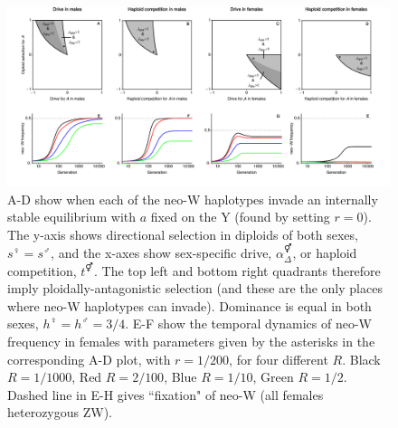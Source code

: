 \documentclass[12pt]{article}
\begin{document}
\begin{landscape}
\begin{figure}[!h]
\centering
\centerline{
\includegraphics[width=\linewidth]{All_plot_combined_PloidAntag}
}
\caption{
A-D show when each of the neo-W haplotypes invade an internally stable equilibrium with $a$ fixed on the Y (found by setting $r=0$).
The y-axis shows directional selection in diploids of both sexes, $s^\female=s^\male$, and the x-axes show sex-specific drive, $\alpha_\Delta^\Hermaphrodite$, or haploid competition, $t^\Hermaphrodite$.
The top left and bottom right quadrants therefore imply ploidally-antagonistic selection (and these are the only places where neo-W haplotypes can invade).
Dominance is equal in both sexes, $h^\female=h^\male=3/4$. 
E-F show the temporal dynamics of neo-W frequency in females with parameters given by the asterisks in the corresponding A-D plot, with $r=1/200$, for four different $R$.
Black $R=1/1000$, Red $R=2/100$, Blue $R=1/10$, Green $R=1/2$.  
Dashed line in E-H gives ``fixation" of neo-W (all females heterozygous ZW).
}
\label{fig:regionPloidAntag}
\end{figure}
\end{landscape}
\end{document}
